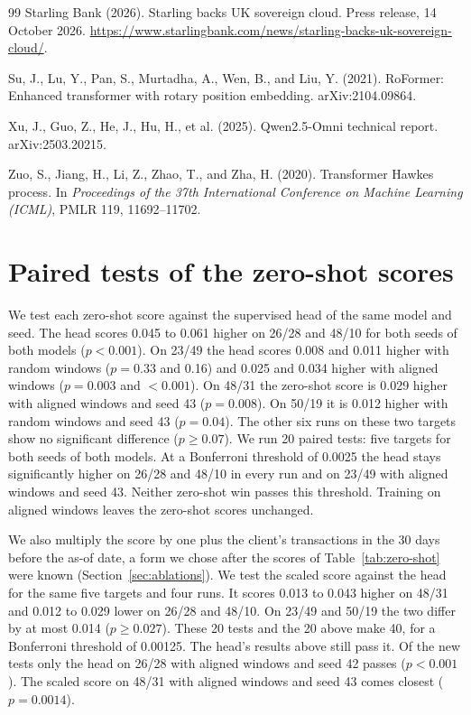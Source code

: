 \documentclass[12pt]{article}
\begin{document}
\begin{thebibliography}{99}
 Starling Bank (2026). Starling backs UK sovereign cloud. Press release, 14 October 2026. \url{https://www.starlingbank.com/news/starling-backs-uk-sovereign-cloud/}.

 Su, J., Lu, Y., Pan, S., Murtadha, A., Wen, B., and Liu, Y. (2021). RoFormer: Enhanced transformer with rotary position embedding. arXiv:2104.09864.

 Xu, J., Guo, Z., He, J., Hu, H., et al. (2025). Qwen2.5-Omni technical report. arXiv:2503.20215.

 Zuo, S., Jiang, H., Li, Z., Zhao, T., and Zha, H. (2020). Transformer Hawkes process. In \emph{Proceedings of the 37th International Conference on Machine Learning (ICML)}, PMLR 119, 11692--11702.

\end{thebibliography}

\appendix
\section{Paired tests of the zero-shot scores}\label{app:tests}

We test each zero-shot score against the supervised head of the same model and seed. The head scores 0.045 to 0.061 higher on 26/28 and 48/10 for both seeds of both models ($p < 0.001$). On 23/49 the head scores 0.008 and 0.011 higher with random windows ($p = 0.33$ and 0.16) and 0.025 and 0.034 higher with aligned windows ($p = 0.003$ and $< 0.001$). On 48/31 the zero-shot score is 0.029 higher with aligned windows and seed 43 ($p = 0.008$). On 50/19 it is 0.012 higher with random windows and seed 43 ($p = 0.04$). The other six runs on these two targets show no significant difference ($p \ge 0.07$). We run 20 paired tests: five targets for both seeds of both models. At a Bonferroni threshold of 0.0025 the head stays significantly higher on 26/28 and 48/10 in every run and on 23/49 with aligned windows and seed 43. Neither zero-shot win passes this threshold. Training on aligned windows leaves the zero-shot scores unchanged.

We also multiply the score by one plus the client's transactions in the 30 days before the as-of date, a form we chose after the scores of Table~\ref{tab:zero-shot} were known (Section~\ref{sec:ablations}). We test the scaled score against the head for the same five targets and four runs. It scores 0.013 to 0.043 higher on 48/31 and 0.012 to 0.029 lower on 26/28 and 48/10. On 23/49 and 50/19 the two differ by at most 0.014 ($p \ge 0.027$). These 20 tests and the 20 above make 40, for a Bonferroni threshold of 0.00125. The head's results above still pass it. Of the new tests only the head on 26/28 with aligned windows and seed 42 passes ($p < 0.001$). The scaled score on 48/31 with aligned windows and seed 43 comes closest ($p = 0.0014$).
\end{document}
